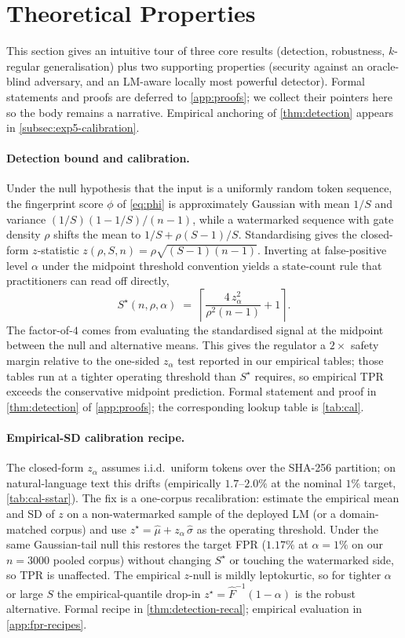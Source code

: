 \section{Theoretical Properties}
\label{sec:theory}

This section gives an intuitive tour of three core results
(detection, robustness, $k$-regular generalisation) plus two
supporting properties (security against an oracle-blind adversary,
and an LM-aware locally most powerful detector).  Formal
statements and proofs are deferred to \autoref{app:proofs}; we collect
their pointers here so the body remains a narrative.  Empirical
anchoring of \autoref{thm:detection} appears in
\autoref{subsec:exp5-calibration}.

\paragraph{Detection bound and calibration.}
Under the null hypothesis that the input is a uniformly random token
sequence, the fingerprint score $\phi$ of \autoref{eq:phi} is
approximately Gaussian with mean $1/S$ and variance
$(1/S)(1-1/S)/(n-1)$, while a watermarked sequence with gate density
$\rho$ shifts the mean to $1/S + \rho(S{-}1)/S$.  Standardising gives
the closed-form $z$-statistic $z(\rho, S, n) = \rho\sqrt{(S-1)(n-1)}$.
Inverting at false-positive level $\alpha$ under the midpoint
threshold convention yields a state-count rule that practitioners can
read off directly,
\[
  S^\star(n,\rho,\alpha)
    \;=\; \left\lceil \frac{4\, z_\alpha^2}{\rho^2 (n-1)} + 1 \right\rceil.
\]
The factor-of-$4$ comes from evaluating the standardised signal at
the midpoint between the null and alternative means. This gives the
regulator a $2\times$ safety margin relative to the one-sided
$z_\alpha$ test reported in our empirical tables; those tables run
at a tighter operating threshold than $S^\star$ requires, so
empirical TPR exceeds the conservative midpoint prediction. Formal
statement and proof in \autoref{thm:detection} of
\autoref{app:proofs}; the corresponding lookup table is
\autoref{tab:cal}.

\paragraph{Empirical-SD calibration recipe.}
The closed-form $z_\alpha$ assumes i.i.d.\ uniform tokens over the
SHA-256 partition; on natural-language text this drifts (empirically
$1.7$--$2.0\%$ at the nominal $1\%$ target,
\autoref{tab:cal-sstar}). The fix is a one-corpus recalibration:
estimate the empirical mean and SD of $z$ on a non-watermarked
sample of the deployed LM (or a domain-matched corpus) and use
$z^\star = \hat\mu + z_\alpha\,\hat\sigma$ as the operating
threshold. Under the same Gaussian-tail null this restores the
target FPR ($1.17\%$ at $\alpha=1\%$ on our $n=3000$ pooled
corpus) without changing $S^\star$ or touching the watermarked
side, so TPR is unaffected. The empirical $z$-null is mildly
leptokurtic, so for tighter $\alpha$ or large $S$ the
empirical-quantile drop-in $z^\star = \hat F^{-1}(1{-}\alpha)$ is the
robust alternative. Formal recipe in
\autoref{thm:detection-recal}; empirical evaluation in
\autoref{app:fpr-recipes}.

